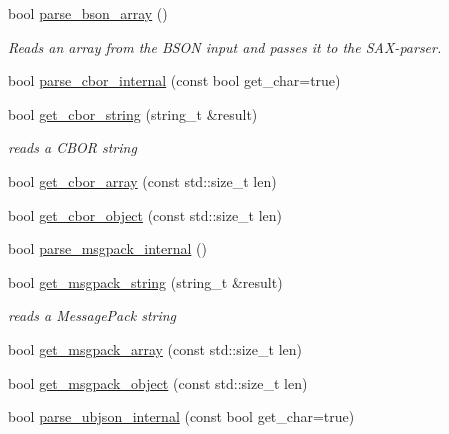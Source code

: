 \begin{DoxyCompactItemize}
bool \mbox{\hyperlink{classnlohmann_1_1detail_1_1binary__reader_a650dd6f9f05e86eb62cd4717301a5ffa}{parse\+\_\+bson\+\_\+array}} ()
\begin{DoxyCompactList}\small\item\em Reads an array from the B\+S\+ON input and passes it to the S\+A\+X-\/parser. \end{DoxyCompactList}\item 
bool \mbox{\hyperlink{classnlohmann_1_1detail_1_1binary__reader_a2fc47768d484a22fcd04e20106da1399}{parse\+\_\+cbor\+\_\+internal}} (const bool get\+\_\+char=true)
\item 
bool \mbox{\hyperlink{classnlohmann_1_1detail_1_1binary__reader_acca76844160000e1d8215cb5c7afbba1}{get\+\_\+cbor\+\_\+string}} (string\+\_\+t \&result)
\begin{DoxyCompactList}\small\item\em reads a C\+B\+OR string \end{DoxyCompactList}\item 
bool \mbox{\hyperlink{classnlohmann_1_1detail_1_1binary__reader_ac3dc99d36754aa0beac506b30604a8ed}{get\+\_\+cbor\+\_\+array}} (const std\+::size\+\_\+t len)
\item 
bool \mbox{\hyperlink{classnlohmann_1_1detail_1_1binary__reader_a2fcc776cd2c7bb52bbc511e97d36978a}{get\+\_\+cbor\+\_\+object}} (const std\+::size\+\_\+t len)
\item 
bool \mbox{\hyperlink{classnlohmann_1_1detail_1_1binary__reader_a81611d8a5faec1348d31f7e98fcd05ef}{parse\+\_\+msgpack\+\_\+internal}} ()
\item 
bool \mbox{\hyperlink{classnlohmann_1_1detail_1_1binary__reader_a5526ed98ca4c436cbae6f8a77ea207b8}{get\+\_\+msgpack\+\_\+string}} (string\+\_\+t \&result)
\begin{DoxyCompactList}\small\item\em reads a Message\+Pack string \end{DoxyCompactList}\item 
bool \mbox{\hyperlink{classnlohmann_1_1detail_1_1binary__reader_a09d3eed7523da6f61e7ffa98823aae2b}{get\+\_\+msgpack\+\_\+array}} (const std\+::size\+\_\+t len)
\item 
bool \mbox{\hyperlink{classnlohmann_1_1detail_1_1binary__reader_ad1190bb3499e243b0bbf795743a35563}{get\+\_\+msgpack\+\_\+object}} (const std\+::size\+\_\+t len)
\item 
bool \mbox{\hyperlink{classnlohmann_1_1detail_1_1binary__reader_af60c6bba6f1301cb02e0186c99e25751}{parse\+\_\+ubjson\+\_\+internal}} (const bool get\+\_\+char=true)

\end{DoxyCompactItemize}
